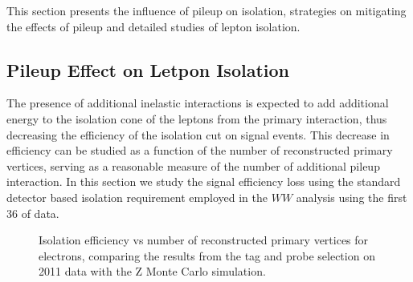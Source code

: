 This section presents the influence of pileup on isolation, strategies on mitigating the effects of pileup and detailed studies of lepton isolation.


\subsection{Pileup Effect on Letpon Isolation}
\label{app:pfIsoStudy}

The presence of additional inelastic interactions is expected to add 
additional energy to the isolation cone of the leptons from the primary 
interaction, thus decreasing the efficiency of the isolation cut on signal 
events. This decrease in efficiency can be studied as a function of the 
number of reconstructed primary vertices, serving as a reasonable measure 
of the number of additional pileup interaction. In this section we study
the signal efficiency loss using the standard detector based isolation
requirement employed in the $WW$ analysis using the first $36$ \ipb of data. 

\begin{figure}[!htbp]
\begin{center}
\caption{Isolation efficiency vs number of reconstructed primary vertices for electrons, comparing the 
results from the tag and probe selection on 2011 data with the Z Monte Carlo simulation.}
\label{fig:eleIsoEff_TagAndProbe_vs_NVertices}
\end{center}
\end{figure}

